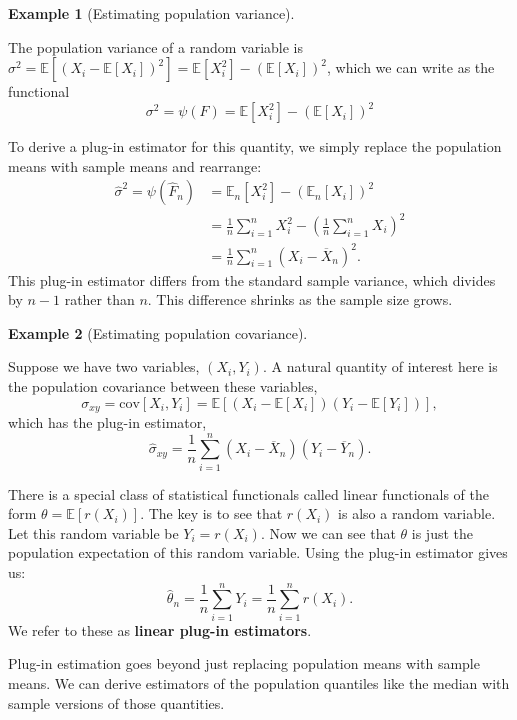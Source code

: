 \documentclass[
  13pt,
  letterpaper,
  DIV=11,
  numbers=noendperiod]{scrreprt}
\newcommand{\E}{\mathbb{E}}
\newcommand{\cov}{\text{cov}}
\newcommand{\Xbar}{\overline{X}}
\newcommand{\Ybar}{\overline{Y}}
\theoremstyle{plain}
\theoremstyle{plain}
\theoremstyle{definition}
\theoremstyle{definition}
\newtheorem{example}{Example}[chapter]
\theoremstyle{remark}
\begin{document}
\begin{example}[Estimating population
variance]\protect\hypertarget{exm-var-est}{}\label{exm-var-est}

The population variance of a random variable is
\(\sigma^2 = \E[(X_i - \E[X_i])^2]=\E[X_i^2] - (\E[X_i])^2\), which we
can write as the functional \[
\sigma^2 = \psi(F) = \E[X_i^2] - (\E[X_i])^2
\]

To derive a plug-in estimator for this quantity, we simply replace the
population means with sample means and rearrange: \[
\begin{aligned}
\widehat{\sigma}^2 = \psi(\widehat{F}_n) &= \E_n[X_i^2] - (\E_n[X_i])^2 \\
&=\frac{1}{n} \sum_{i=1}^n X_i^2 - \left(\frac{1}{n} \sum_{i=1}^n X_i\right)^2 \\
&=\frac{1}{n} \sum_{i=1}^n (X_i - \Xbar_n)^2.
\end{aligned}
\] This plug-in estimator differs from the standard sample variance,
which divides by \(n - 1\) rather than \(n\). This difference shrinks as
the sample size grows.

\end{example}

\begin{example}[Estimating population
covariance]\protect\hypertarget{exm-cov-est}{}\label{exm-cov-est}

Suppose we have two variables, \((X_i, Y_i)\). A natural quantity of
interest here is the population covariance between these variables, \[
\sigma_{xy} = \cov[X_i,Y_i] = \E[(X_i - \E[X_i])(Y_i-\E[Y_i])],
\] which has the plug-in estimator, \[
\widehat{\sigma}_{xy} = \frac{1}{n} \sum_{i=1}^n (X_i - \Xbar_n)(Y_i - \Ybar_n).
\]

\end{example}

There is a special class of statistical functionals called linear
functionals of the form \(\theta = \E[r(X_i)]\). The key is to see that
\(r(X_i)\) is also a random variable. Let this random variable be
\(Y_i = r(X_i)\). Now we can see that \(\theta\) is just the population
expectation of this random variable. Using the plug-in estimator gives
us: \[
\widehat{\theta}_n = \frac{1}{n} \sum_{i=1}^n Y_i = \frac{1}{n} \sum_{i=1}^n r(X_i).
\] We refer to these as \textbf{linear plug-in estimators}.

Plug-in estimation goes beyond just replacing population means with
sample means. We can derive estimators of the population quantiles like
the median with sample versions of those quantities.
\end{document}
